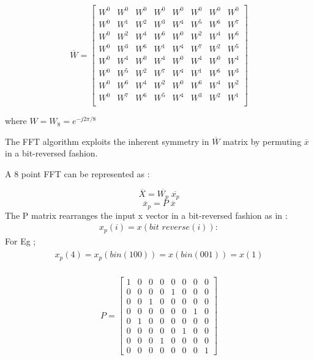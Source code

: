 \documentclass[journal,12pt,twocolumn]{IEEEtran}
\renewcommand\thesection{\arabic{section}}
\begin{document}
\begin{enumerate}[label=\thesection.\arabic*.,ref=\thesection.\theenumi]
\begin{equation}
\overline{W}
=
\begin{bmatrix}
W^{0} & W^{0} & W^{0} & W^{0} & W^{0} & W^{0} & W^{0} & W^{0} \\
W^{0} & W^{1} & W^{2} & W^{3} & W^{4} & W^{5} & W^{6} & W^{7} \\
W^{0} & W^{2} & W^{4} & W^{6} & W^{0} & W^{2} & W^{4} & W^{6} \\
W^{0} & W^{3} & W^{6} & W^{1} & W^{4} & W^{7} & W^{2} & W^{5} \\
W^{0} & W^{4} & W^{0} & W^{4} & W^{0} & W^{4} & W^{0} & W^{4} \\
W^{0} & W^{5} & W^{2} & W^{7} & W^{4} & W^{1} & W^{6} & W^{3} \\
W^{0} & W^{6} & W^{4} & W^{2} & W^{0} & W^{6} & W^{4} & W^{2} \\
W^{0} & W^{7} & W^{6} & W^{5} & W^{4} & W^{3} & W^{2} & W^{1} \\

\end{bmatrix}
\end{equation}

where $ W = W_{8} = e^{-j2\pi/8}$ \bigskip

The FFT algorithm exploits the inherent symmetry in $\overline{W}$ matrix by permuting $\overline{x}$ in a bit-reversed fashion.

A 8 point FFT can be represented as :

    $$\overline{X} = \overline{W_p}\;  \overline{x_p}$$\newline
    $$\overline{x}_{p} = P \; \overline{x}$$  
The P matrix rearranges the input x vector in a bit-reversed fashion as in : 
\begin{align}
    x_{p}(i) = x(\textit{bit reverse}(i)):
\end{align}
For Eg ; 
\begin{align}
\begin{split}
  x_{p}(4) = x_{p}(bin(100)) = x(bin(001)) = x(1)\\
\end{split}
\end{align}

\begin{equation}
    P = 
    \begin{bmatrix}
1 & 0 & 0 & 0 & 0 & 0 & 0 & 0 \\
0 & 0 & 0 & 0 & 1 & 0 & 0 & 0 \\
0 & 0 & 1 & 0 & 0 & 0 & 0 & 0 \\
0 & 0 & 0 & 0 & 0 & 0 & 1 & 0 \\
0 & 1 & 0 & 0 & 0 & 0 & 0 & 0 \\
0 & 0 & 0 & 0 & 0 & 1 & 0 & 0 \\
0 & 0 & 0 & 1 & 0 & 0 & 0 & 0 \\
0 & 0 & 0 & 0 & 0 & 0 & 0 & 1  


\end{bmatrix}
\end{equation}
\end{enumerate}
\end{document}
